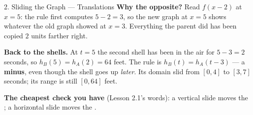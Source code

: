 \documentclass[10pt]{article}
\begin{document}
\begin{notesbox}{2. Sliding the Graph --- Translations}
\vspace{2pt}
\textbf{Why the opposite?} Read $f(x-2)$ at $x=5$: the rule first computes $5-2=3$, so the new
graph at $x=5$ shows whatever the old graph showed at $x=3$. Everything the parent did has been
copied $2$ units farther right.

\vspace{4pt}
\textbf{Back to the shells.} At $t=5$ the second shell has been in the air for $5-3=2$ seconds, so
$h_B(5)=h_A(2)=64$ feet. The rule is $h_B(t)=h_A(t-3)$ --- a \textbf{minus}, even though the shell
goes up \emph{later}. Its domain slid from $[0,4]$ to $[3,7]$ seconds; its range is still
$[0,64]$ feet.

\vspace{4pt}
\textbf{The cheapest check you have} (Lesson 2.1's words): a vertical slide moves the
; a horizontal slide moves the .
\end{notesbox}

\vspace{0.10in}
\end{document}
